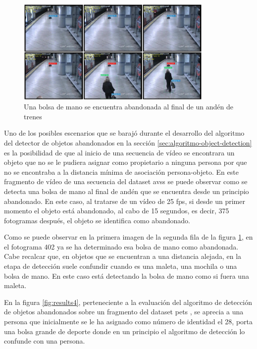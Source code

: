 \begin{figure}[ht]
\centering
\includegraphics[width=0.85\textwidth]{img/chapters/resultados/abandono/3.png}
\caption{\label{fig:results3}Una bolsa de mano se encuentra abandonada al final de un andén de trenes \cite{AVSSAB2007-dataset}}
\end{figure}

Uno de los posibles escenarios que se barajó durante el desarrollo del algoritmo del detector de objetos abandonados en la sección \ref{sec:algoritmo-object-detection} es la posibilidad de que al inicio de una secuencia de vídeo se encontrara un objeto que no se le pudiera asignar como propietario a ninguna persona por que no se encontraba a la distancia mínima de asociación persona-objeto. En este fragmento de vídeo de una secuencia del dataset \gls{avss} \cite{AVSSAB2007-dataset} se puede observar como se detecta una bolsa de mano al final de andén que se encuentra desde un principio abandonado. En este caso, al tratarse de un vídeo de 25 \gls{fps}, si desde un primer momento el objeto está abandonado, al cabo de 15 segundos, es decir, 375 fotogramas después, el objeto se identifica como abandonado.

Como se puede observar en la primera imagen de la segunda fila de la figura \ref{fig:results3}, en el fotograma 402 ya se ha determinado esa bolsa de mano como abandonada. Cabe recalcar que, en objetos que se encuentran a una distancia alejada, en la etapa de detección suele confundir cuando es una maleta, una mochila o una bolsa de mano. En este caso está detectando la bolsa de mano como si fuera una maleta. 

En la figura \ref{fig:results4}, perteneciente a la evaluación del algoritmo de detección de objetos abandonados sobre un fragmento del dataset \gls{pets} \cite{pets2007-dataset}, se aprecia a una persona que inicialmente se le ha asignado como número de identidad el 28, porta una bolsa grande de deporte donde en un principio el algoritmo de detección lo confunde con una persona.

